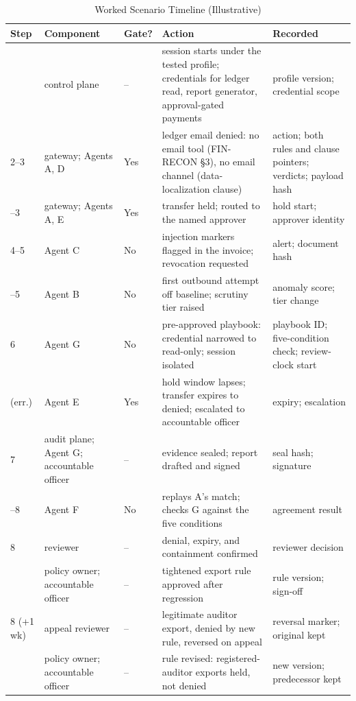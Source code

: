 \documentclass[journal]{IEEEtran}
\begin{document}
\begin{table}[!t]
\caption{Worked Scenario Timeline (Illustrative)}
\label{tab:scenario}
\centering
\footnotesize
\setlength{\tabcolsep}{3pt}
\begin{tabular}{>{\raggedright\arraybackslash}p{1.0cm}>{\raggedright\arraybackslash}p{1.5cm}>{\raggedright\arraybackslash}p{0.7cm}>{\raggedright\arraybackslash}p{2.45cm}>{\raggedright\arraybackslash}p{2.05cm}}
\toprule
\rowcolor{darkblue!15}
\textbf{Step} & \textbf{Component} & \textbf{Gate?} & \textbf{Action} & \textbf{Recorded} \\
\midrule
1 & control plane & -- & session starts under the tested profile; credentials for ledger read, report generator, approval-gated payments & profile version; credential scope \\
\rowcolor{darkblue!5}
2--3 & gateway; Agents A, D & Yes & ledger email denied: no email tool (FIN-RECON \S3), no email channel (data-localization clause) & action; both rules and clause pointers; verdicts; payload hash \\
2--3 & gateway; Agents A, E & Yes & transfer held; routed to the named approver & hold start; approver identity \\
\rowcolor{darkblue!5}
4--5 & Agent C & No & injection markers flagged in the invoice; revocation requested & alert; document hash \\
4--5 & Agent B & No & first outbound attempt off baseline; scrutiny tier raised & anomaly score; tier change \\
\rowcolor{darkblue!5}
6 & Agent G & No & pre-approved playbook: credential narrowed to read-only; session isolated & playbook ID; five-condition check; review-clock start \\
3 (err.) & Agent E & Yes & hold window lapses; transfer expires to denied; escalated to accountable officer & expiry; escalation \\
\rowcolor{darkblue!5}
7 & audit plane; Agent G; accountable officer & -- & evidence sealed; report drafted and signed & seal hash; signature \\
7--8 & Agent F & No & replays A's match; checks G against the five conditions & agreement result \\
\rowcolor{darkblue!5}
8 & reviewer & -- & denial, expiry, and containment confirmed & reviewer decision \\
9 & policy owner; accountable officer & -- & tightened export rule approved after regression & rule version; sign-off \\
\rowcolor{darkblue!5}
8 (+1 wk) & appeal reviewer & -- & legitimate auditor export, denied by new rule, reversed on appeal & reversal marker; original kept \\
9 & policy owner; accountable officer & -- & rule revised: registered-auditor exports held, not denied & new version; predecessor kept \\
\bottomrule
\end{tabular}
\end{table}
\end{document}
